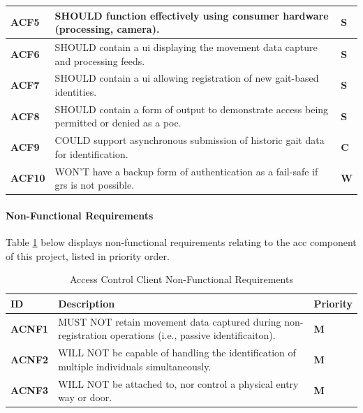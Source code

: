 \begin{scriptsize}
\begin{longtable}[H]{|p{}|p{}|p{}|}
        \textbf{ACF5}  & SHOULD function effectively using consumer hardware (processing, camera).                      & \cellcolor{orange!10} \textbf{S} \\ \hline
        \textbf{ACF6}  & SHOULD contain a \ac{ui} displaying the movement data capture and processing feeds.            & \cellcolor{orange!10} \textbf{S} \\ \hline
        \textbf{ACF7}  & SHOULD contain a \ac{ui} allowing registration of new gait-based identities.                   & \cellcolor{orange!10} \textbf{S} \\ \hline
        \textbf{ACF8}  & SHOULD contain a form of output to demonstrate access being permitted or denied as a \ac{poc}. & \cellcolor{orange!10} \textbf{S} \\ \hline
        \textbf{ACF9}  & COULD support asynchronous submission of historic gait data for identification.                & \cellcolor{yellow!10} \textbf{C} \\ \hline
        \textbf{ACF10} & WON'T have a backup form of authentication as a fail-safe if \ac{grs} is not possible.         & \cellcolor{green!10} \textbf{W}  \\
    \end{longtable}
\end{scriptsize}

\paragraph{Non-Functional Requirements} Table \ref{tab:acc-non-functional-requirements} below displays non-functional requirements relating to the \ac{acc} component of this project, listed in priority order.

\begin{table}[H]
    \caption{Access Control Client Non-Functional Requirements}
    \label{tab:acc-non-functional-requirements}
    \begin{scriptsize}
        \begin{tabular}{|p{}|p{}|p{}|}
            \hline
            \textbf{ID}    & \textbf{Description}                                                                                      & \textbf{Priority}             \\ \hline
            \textbf{ACNF1} & MUST NOT retain movement data captured during non-registration operations (i.e., passive identificaiton). & \cellcolor{red!10} \textbf{M} \\ \hline
            \textbf{ACNF2} & WILL NOT be capable of handling the identification of multiple individuals simultaneously.                & \cellcolor{red!10} \textbf{M} \\ \hline
            \textbf{ACNF3} & WILL NOT be attached to, nor control a physical entry way or door.                                        & \cellcolor{red!10} \textbf{M} \\ \hline
        \end{tabular}
    \end{scriptsize}
\end{table}

